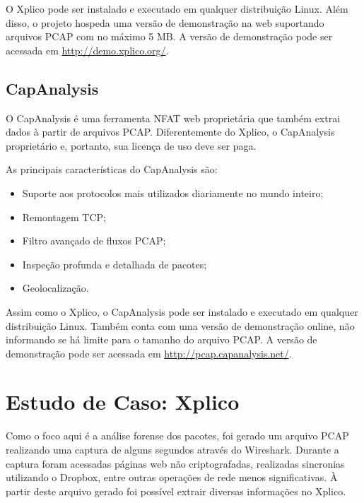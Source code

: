 \documentclass[12pt]{article}
\begin{document}
O Xplico pode ser instalado e executado em qualquer distribuição Linux. Além disso, o projeto hospeda uma versão de demonstração na web suportando arquivos PCAP com no máximo 5 MB. A versão de demonstração pode ser acessada em \href{http://demo.xplico.org/}{http://demo.xplico.org/}.

\subsection{CapAnalysis}

O CapAnalysis é uma ferramenta NFAT web proprietária que também extrai dados à partir de arquivos PCAP. Diferentemente do Xplico, o CapAnalysis proprietário e, portanto, sua licença de uso deve ser paga.

As principais características do CapAnalysis são:

\begin{itemize}
  \item Suporte aos protocolos mais utilizados diariamente no mundo inteiro;
  \item Remontagem TCP;
  \item Filtro avançado de fluxos PCAP;
  \item Inspeção profunda e detalhada de pacotes;
  \item Geolocalização.
\end{itemize}

Assim como o Xplico, o CapAnalysis pode ser instalado e executado em qualquer distribuição Linux. Também conta com uma versão de demonstração online, não informando se há limite para o tamanho do arquivo PCAP. A versão de demonstração pode ser acessada em \href{http://pcap.capanalysis.net/}{http://pcap.capanalysis.net/}.

\section{Estudo de Caso: Xplico}

Como o foco aqui é a análise forense dos pacotes, foi gerado um arquivo PCAP realizando uma captura de alguns segundos através do Wireshark. Durante a captura foram acessadas páginas web não criptografadas, realizadas sincronias utilizando o Dropbox, entre outras operações de rede menos significativas. À partir deste arquivo gerado foi possível extrair diversas informações no Xplico.
\end{document}
